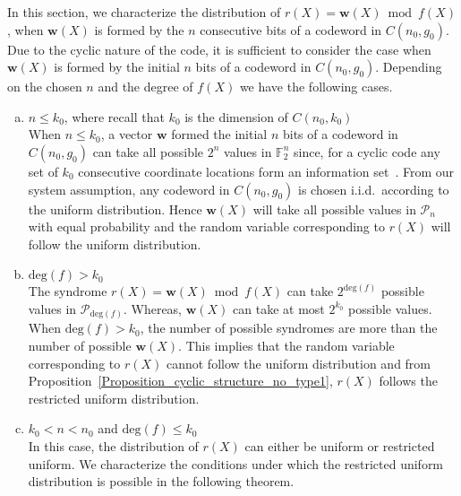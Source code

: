 \documentclass[10pt,journal]{IEEEtran}
\def \deg{{\mathrm{deg}}}
\begin{document}
In this section, we characterize the distribution of $r(X) = \mathbf{w}(X) \bmod f(X)$, when
$\mathbf{w}(X)$ is formed by the $n$ consecutive bits of a codeword in $C(n_0,g_0)$.
Due to the cyclic nature of the code, it is sufficient to consider the case when $\mathbf{w}(X)$ is formed by 
the initial $n$ bits of a codeword in $C(n_0,g_0)$.
Depending on the chosen $n$ and the degree of $f(X)$ we have the following cases.
% 
\begin{enumerate}[(a)]
%  
\item $n \leq k_0$, where recall that $k_0$ is the dimension of $C(n_0,k_0)$\\
When $n \leq k_0$, a vector $\mathbf{w}$ formed the initial $n$ bits of a codeword in $C(n_0,g_0)$
can take all possible $2^n$ values in $\mathbb{F}_2^n$ 
since, for a cyclic code any set of $k_0$ consecutive coordinate locations form an information set~\cite{Huffman_Pless_ECC}.
% 
From our system assumption, any codeword in $C(n_0,g_0)$ is chosen i.i.d.~according to the uniform
distribution.
Hence $\mathbf{w}(X)$ will take all possible values in $\mathcal{P}_n$ with equal probability and
the random variable corresponding to $r(X)$ will follow the uniform distribution.
% 
\item $\deg(f) > k_0$\\
% 
The syndrome $r(X) = \mathbf{w}(X) \bmod f(X)$ can take $2^{\deg(f)}$ possible values in $\mathcal{P}_{\deg(f)}$. 
Whereas, $\mathbf{w}(X)$ can take at most $2^{k_0}$ possible values.
When $\deg(f) > k_0$, the number of possible syndromes are more than the number of possible $\mathbf{w}(X)$.
This implies that the random variable corresponding to $r(X)$ cannot follow the uniform distribution
and from Proposition~\ref{Proposition_cyclic_structure_no_type1}, $r(X)$ follows the restricted uniform distribution. 
% 
\item $k_0 < n < n_0$ and $\deg(f) \leq k_0$\\
In this case, the distribution of $r(X)$ can either be uniform or restricted uniform.
We characterize the conditions under which the restricted uniform distribution is possible in the following theorem.
% 
\end{enumerate}
% 
\end{document}
